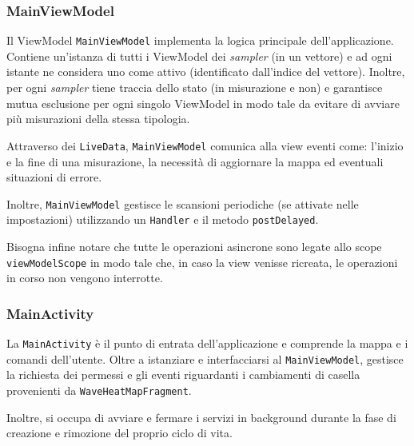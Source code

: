\subsubsection{MainViewModel}
Il ViewModel \texttt{MainViewModel} implementa la logica principale dell'applicazione. Contiene un'istanza di tutti i ViewModel dei \textit{sampler} (in un vettore) e ad ogni istante ne considera uno come attivo (identificato dall'indice del vettore). Inoltre, per ogni \textit{sampler} tiene traccia dello stato (in misurazione e non) e garantisce mutua esclusione per ogni singolo ViewModel in modo tale da evitare di avviare più misurazioni della stessa tipologia.

Attraverso dei \texttt{LiveData}, \texttt{MainViewModel} comunica alla view eventi come: l'inizio e la fine di una misurazione, la necessità di aggiornare la mappa ed eventuali situazioni di errore.

Inoltre, \texttt{MainViewModel} gestisce le scansioni periodiche (se attivate nelle impostazioni) utilizzando un \texttt{Handler} e il metodo \texttt{postDelayed}.

Bisogna infine notare che tutte le operazioni asincrone sono legate allo scope \texttt{viewModelScope} in modo tale che, in caso la view venisse ricreata, le operazioni in corso non vengono interrotte.


\subsubsection{MainActivity}
La \texttt{MainActivity} è il punto di entrata dell'applicazione e comprende la mappa e i comandi dell'utente.
Oltre a istanziare e interfacciarsi al \texttt{MainViewModel}, gestisce la richiesta dei permessi e gli eventi riguardanti i cambiamenti di casella provenienti da \texttt{WaveHeatMapFragment}.

Inoltre, si occupa di avviare e fermare i servizi in background durante la fase di creazione e rimozione del proprio ciclo di vita.